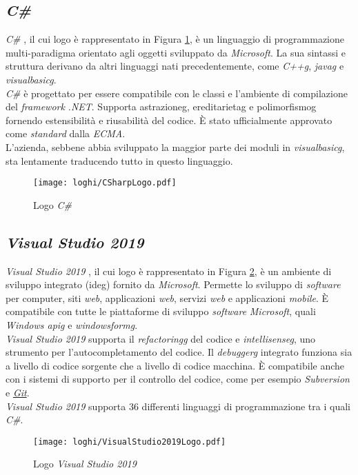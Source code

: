 \subsection*{\textit{C\#}}
\noindent \textit{C\#} \cite{site:csharp-docs}, il cui logo è rappresentato in Figura \ref{logoCSharp}, è un linguaggio di programmazione multi-paradigma orientato agli oggetti
sviluppato da \textit{Microsoft}. La sua sintassi e struttura derivano da altri linguaggi nati
precedentemente, come \textit{\gls{C++g}}, \textit{\gls{javag}} e \textit{\gls{visualbasicg}}.\\
\textit{C\#} è progettato per essere compatibile con le classi e l’ambiente di compilazione
del \textit{framework} \textit{.NET}. Supporta \gls{astrazioneg}, \gls{ereditarietag} e \gls{polimorfismog}
fornendo estensibilità e riusabilità del codice.
È stato ufficialmente approvato come \textit{standard} dalla \textit{ECMA}.\\
L'azienda, sebbene abbia sviluppato la maggior parte dei moduli
in \textit{\gls{visualbasicg}}, sta lentamente traducendo tutto in questo linguaggio.
\begin{figure}[!h] 
    \centering 
    \texttt{[image: loghi/CSharpLogo.pdf]} 
    \caption{Logo \textit{C\#}}
    \label{logoCSharp}
 \end{figure}

\subsection*{\textit{Visual Studio 2019}}
\noindent \textit{Visual Studio 2019} \cite{site:vs-docs}, il cui logo è rappresentato in Figura \ref{logoVisualStudio}, è un ambiente di sviluppo integrato (\gls{ideg}) fornito da \textit{Microsoft}.
Permette lo sviluppo di \textit{software} per computer, siti \textit{web}, applicazioni \textit{web}, servizi \textit{web}
e applicazioni \textit{mobile}. È compatibile con tutte le piattaforme di sviluppo
\textit{software} \textit{Microsoft}, quali \textit{Windows \gls{apig}} e \textit{\gls{windowsformg}}.\\
\textit{Visual Studio 2019} supporta il \textit{\gls{refactoringg}} del codice e \textit{\gls{intellisenseg}}, uno strumento per
l’autocompletamento del codice. Il \textit{\gls{debuggerg}} integrato funziona sia a
livello di codice sorgente che a livello di codice macchina. È compatibile anche con i sistemi di supporto per il controllo del codice,
come per esempio \textit{Subversion} e \textit{\hyperref[sec:git]{Git}}.\\
\textit{Visual Studio 2019} supporta 36 differenti linguaggi di 
programmazione tra i quali \textit{C\#}.
\begin{figure}[!h] 
    \centering 
    \texttt{[image: loghi/VisualStudio2019Logo.pdf]} 
    \caption{Logo \textit{Visual Studio 2019}}
    \label{logoVisualStudio}
 \end{figure}

